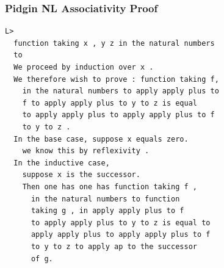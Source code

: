 \documentclass[9pt]{beamer}
\begin{document}
\begin{frame}[fragile]

\frametitle{Pidgin NL Associativity Proof}
\begin{verbatim}
L> 
  function taking x , y z in the natural numbers 
  to 
  We proceed by induction over x .
  We therefore wish to prove : function taking f, 
    in the natural numbers to apply apply plus to 
    f to apply apply plus to y to z is equal 
    to apply apply plus to apply apply plus to f 
    to y to z .
  In the base case, suppose x equals zero.
    we know this by reflexivity .
  In the inductive case, 
    suppose x is the successor. 
    Then one has one has function taking f , 
      in the natural numbers to function
      taking g , in apply apply plus to f 
      to apply apply plus to y to z is equal to
      apply apply plus to apply apply plus to f 
      to y to z to apply ap to the successor
      of g.
\end{verbatim}
\end{frame}


\end{document}
